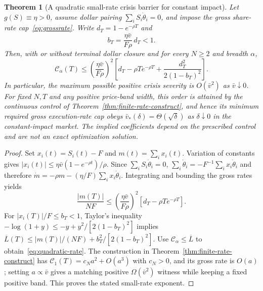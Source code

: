 \documentclass[11pt]{article}
\numberwithin{equation}{section}
\newtheorem{theorem}{Theorem}[section]
\theoremstyle{definition}
\theoremstyle{remark}
\begin{document}
\begin{theorem}[A quadratic small-rate crisis barrier for constant impact]\label{thm:quadratic-rate}
Let $g(S)\equiv\eta>0$, assume dollar pairing $\sum_iS_i\dot\theta_i=0$, and impose the gross share-rate cap~\eqref{eq:grossrate}. Write $d_T=1-e^{-\rho T}$ and
\begin{equation}\label{eq:bsmall}
 b_T=\frac{\eta\bar v}{F\rho}\,d_T<1.
\end{equation}
Then, with or without terminal dollar closure and for \emph{every} $N\ge2$ and breadth $\alpha$,
\begin{equation}\label{eq:quadratic-rate}
\boxed{\ \mathcal C_\alpha(T)\le
\left(\frac{\eta\bar v}{F\rho}\right)^2
\left[d_T-\rho T e^{-\rho T}
 +\frac{d_T^2}{2(1-b_T)^2}\right].\ }
\end{equation}
In particular, the maximum possible positive crisis severity is $O(\bar v^2)$ as $\bar v\downarrow0$. For fixed $N,T$ and any positive price-band width, this \emph{order is attained} by the continuous control of Theorem~\ref{thm:finite-rate-construct}, and hence its minimum required gross execution-rate cap obeys $\bar v_*(\delta)=\Theta(\sqrt\delta)$ as $\delta\downarrow0$ in the constant-impact market. The implied coefficients depend on the prescribed control and are not an exact optimization solution.
\end{theorem}
\begin{proof}
Set $x_i(t)=S_i(t)-F$ and $m(t)=\sum_i x_i(t)$. Variation of constants gives
$|x_i(t)|\le\eta\bar v(1-e^{-\rho t})/\rho$. Since $\sum_iS_i\dot\theta_i=0$,
$\sum_i\dot\theta_i=-F^{-1}\sum_i x_i\dot\theta_i$ and therefore
$\dot m=-\rho m-(\eta/F)\sum_i x_i\dot\theta_i$. Integrating and bounding the gross rates yields
\begin{equation}\label{eq:meanprice}
\frac{|m(T)|}{NF}\le
\left(\frac{\eta\bar v}{F\rho}\right)^2
 [d_T-\rho T e^{-\rho T}].
\end{equation}
For $|x_i(T)|/F\le b_T<1$, Taylor's inequality
$-\log(1+y)\le-y+y^2/[2(1-b_T)^2]$ implies
$\overline L(T)\le |m(T)|/(NF)+b_T^2/[2(1-b_T)^2]$.
Use $\mathcal C_\alpha\le\overline L$ to obtain~\eqref{eq:quadratic-rate}. The construction in Theorem~\ref{thm:finite-rate-construct} has $\mathcal C_1(T)=c_Na^2+O(a^3)$ with $c_N>0$, and its gross rate is $O(a)$; setting $a\propto\bar v$ gives a matching positive $\Omega(\bar v^2)$ witness while keeping a fixed positive band. This proves the stated small-rate exponent.
\end{proof}
\end{document}
